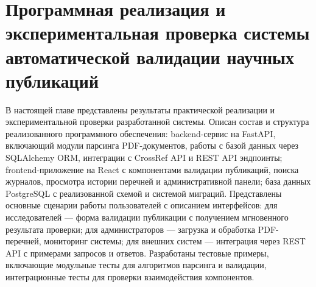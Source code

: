 \chapter{Программная реализация и экспериментальная проверка системы автоматической валидации научных публикаций}

В настоящей главе представлены результаты практической реализации и экспериментальной проверки разработанной системы. 
Описан состав и структура реализованного программного обеспечения: backend-сервис на FastAPI, 
включающий модули парсинга PDF-документов, работы с базой данных через SQLAlchemy ORM, интеграции с CrossRef API и REST API 
эндпоинты; frontend-приложение на React с компонентами валидации публикаций, поиска журналов, просмотра истории перечней и 
административной панели; база данных PostgreSQL с реализованной схемой и системой миграций. Представлены основные сценарии работы 
пользователей с описанием интерфейсов: для исследователей — форма валидации публикации с получением мгновенного результата 
проверки; для администраторов — загрузка и обработка PDF-перечней, мониторинг системы; для внешних систем — интеграция через REST API с
 примерами запросов и ответов. Разработаны тестовые примеры, включающие модульные тесты для алгоритмов парсинга и валидации, 
 интеграционные тесты для проверки взаимодействия компонентов.